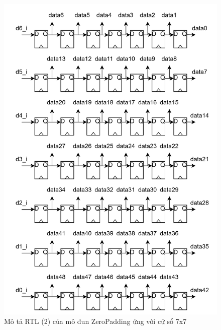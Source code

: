 \begin{figure}[H]
	\centering
	\includegraphics[width=\linewidth]{figures/zero7x7Architecture2.png}
	\caption{Mô tả RTL (2) của mô đun ZeroPadding ứng với cử sổ 7x7}
	\label{fig:zero7x7Architecture2}
\end{figure}


